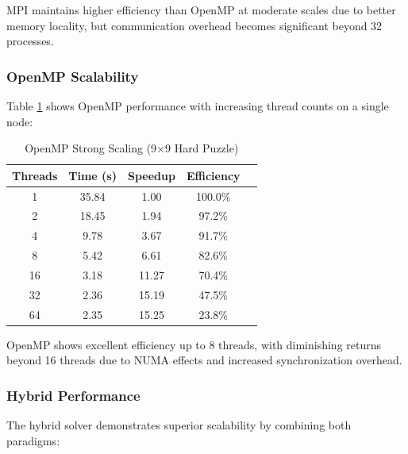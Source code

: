 MPI maintains higher efficiency than OpenMP at moderate scales due to better memory locality, but communication overhead becomes significant beyond 32 processes.

\subsubsection{OpenMP Scalability}
Table \ref{tab:openmp_scaling} shows OpenMP performance with increasing thread counts on a single node:

\begin{table}[htbp]
\caption{OpenMP Strong Scaling (9×9 Hard Puzzle)}
\begin{center}
\begin{tabular}{@{}ccccc@{}}
\toprule
\textbf{Threads} & \textbf{Time (s)} & \textbf{Speedup} & \textbf{Efficiency} \\
\midrule
1 & 35.84 & 1.00 & 100.0\% \\
2 & 18.45 & 1.94 & 97.2\% \\
4 & 9.78 & 3.67 & 91.7\% \\
8 & 5.42 & 6.61 & 82.6\% \\
16 & 3.18 & 11.27 & 70.4\% \\
32 & 2.36 & 15.19 & 47.5\% \\
64 & 2.35 & 15.25 & 23.8\% \\
\bottomrule
\end{tabular}
\end{center}
\label{tab:openmp_scaling}
\end{table}

OpenMP shows excellent efficiency up to 8 threads, with diminishing returns beyond 16 threads due to NUMA effects and increased synchronization overhead.


\subsubsection{Hybrid Performance}
The hybrid solver demonstrates superior scalability by combining both paradigms:

